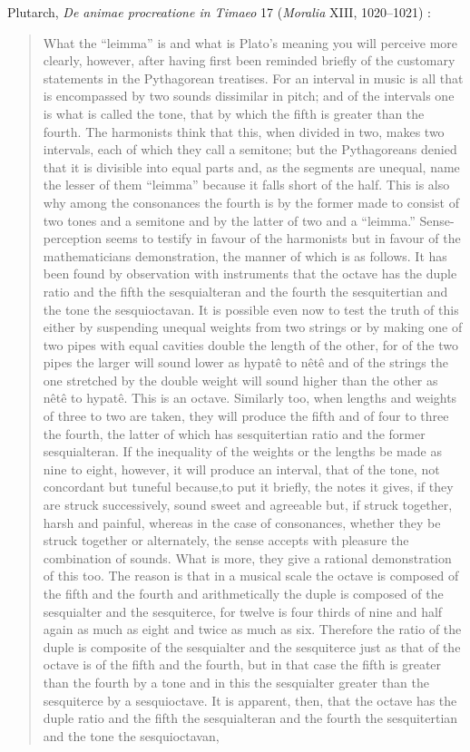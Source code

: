 \documentclass{article}
\theoremstyle{definition}
\begin{document}
Plutarch, {\em De animae procreatione in Timaeo} 17 ({\em Moralia} XIII, 1020--1021) \cite[pp.~303--309]{LCL427}:

\begin{quote}
What the ``leimma'' is and what is Plato's meaning you will perceive more clearly, however, after having first been reminded briefly of the customary statements in the Pythagorean treatises. For an interval in music is all that is encompassed by two sounds dissimilar in pitch; and of the intervals one is what is called the tone, that by which the fifth is greater than
the fourth. The harmonists think that this, when divided in two, makes two intervals, each of which they call a semitone; but the Pythagoreans denied that it is divisible into equal
parts and, as the segments are unequal, name the lesser of them ``leimma'' because it falls short of the half. This is also why among the consonances the fourth is by the former 
made to consist of two tones and a semitone and by the latter of two and a ``leimma.'' Sense-perception seems to testify in favour of the harmonists but in favour of the
mathematicians demonstration, the manner of which is
as follows. It has been found by observation with instruments that the octave has the duple ratio and the fifth the sesquialteran and the fourth the sesquitertian and the tone
the sesquioctavan. It is possible even now to test the truth of this either by suspending unequal weights from two strings or by making one of two pipes with equal cavities double
the length of the other, for of the two pipes the larger will sound lower as hypat\^e to n\^et\^e and of the strings the one stretched by the double weight will 
sound higher than the other as n\^et\^e to hypat\^e. This is an octave. Similarly too, when lengths and weights of three to two are taken, they will produce the fifth and of four to three
the fourth, the latter of which has sesquitertian ratio and the former sesquialteran. If the inequality of the weights or the
lengths be made as nine to eight, however, it will produce an interval, that of the tone, not concordant but tuneful because,to put it briefly, the notes it gives, if they are struck 
successively, sound sweet and agreeable but, if struck together, harsh and painful, whereas in the case of consonances, whether they be struck together or alternately, the sense
accepts with pleasure the combination of sounds. What is more, they give a rational demonstration of this too. The reason is that in a musical scale the octave is composed of the 
fifth and the fourth and arithmetically the duple is composed of the sesquialter and the sesquiterce, for twelve is four thirds of nine and half again as much as eight and twice as
much as six. Therefore the ratio of the duple is composite of the sesquialter and the sesquiterce just as that of the octave is of the fifth and the fourth, but in that case the fifth is 
greater than the fourth by a tone and in this the sesquialter greater than the sesquiterce by a sesquioctave. It is apparent, then, that the octave
has the duple ratio and the fifth the sesquialteran and the fourth the sesquitertian and the tone the sesquioctavan,
\end{quote}
\end{document}
